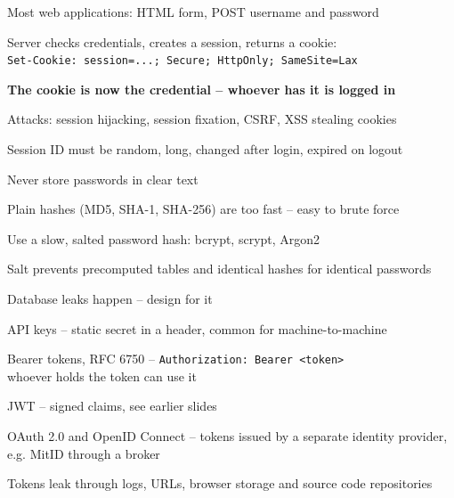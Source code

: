 \documentclass[Screen16to9,17pt]{foils}
\begin{document}

\begin{list2}
\item Most web applications: HTML form, POST username and password
\item Server checks credentials, creates a session, returns a cookie:\\
  \verb+Set-Cookie: session=...; Secure; HttpOnly; SameSite=Lax+
\item \textbf {The cookie is now the credential -- whoever has it is logged in}
\item Attacks: session hijacking, session fixation, CSRF, XSS stealing cookies
\item Session ID must be random, long, changed after login, expired on logout
\end{list2}



\begin{list2}
\item Never store passwords in clear text
\item Plain hashes (MD5, SHA-1, SHA-256) are too fast -- easy to brute force
\item Use a slow, salted password hash: bcrypt, scrypt, Argon2
\item Salt prevents precomputed tables and identical hashes for identical passwords
\item Database leaks happen -- design for it
\end{list2}


\begin{list2}
\item API keys -- static secret in a header, common for machine-to-machine
\item Bearer tokens, RFC 6750 -- \verb+Authorization: Bearer <token>+\\
  whoever holds the token can use it
\item JWT -- signed claims, see earlier slides
\item OAuth 2.0 and OpenID Connect -- tokens issued by a separate identity provider,\\
  e.g. MitID through a broker
\item Tokens leak through logs, URLs, browser storage and source code repositories
\end{list2}
\end{document}
